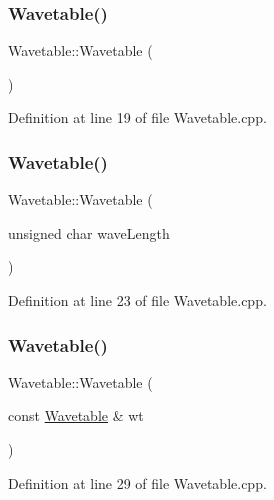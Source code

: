\subsubsection{\texorpdfstring{Wavetable()}{Wavetable()}\hspace{0.1cm}{\footnotesize\ttfamily [1/3]}}
{\footnotesize\ttfamily Wavetable\+::\+Wavetable (\begin{DoxyParamCaption}{ }\end{DoxyParamCaption})}



Definition at line 19 of file Wavetable.\+cpp.

\mbox{\label{class_wavetable_a4b95309638a0ba90cf170e8e0b8fa453}} 
\subsubsection{\texorpdfstring{Wavetable()}{Wavetable()}\hspace{0.1cm}{\footnotesize\ttfamily [2/3]}}
{\footnotesize\ttfamily Wavetable\+::\+Wavetable (\begin{DoxyParamCaption}\item[{unsigned char}]{wave\+Length }\end{DoxyParamCaption})}



Definition at line 23 of file Wavetable.\+cpp.

\mbox{\label{class_wavetable_ad0d61af03ebf9df4989971ed42245d8f}} 
\subsubsection{\texorpdfstring{Wavetable()}{Wavetable()}\hspace{0.1cm}{\footnotesize\ttfamily [3/3]}}
{\footnotesize\ttfamily Wavetable\+::\+Wavetable (\begin{DoxyParamCaption}\item[{const \hyperlink{class_wavetable}{Wavetable} \&}]{wt }\end{DoxyParamCaption})}



Definition at line 29 of file Wavetable.\+cpp.

